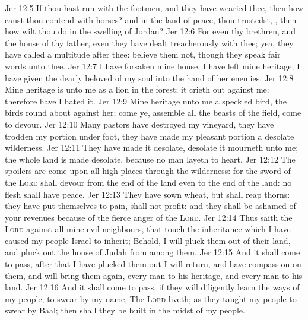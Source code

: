 \vs Jer 12:5 If thou hast run with the footmen, and they have wearied thee, then how canst thou contend with horses? and  in the land of peace,  thou trustedst, , then how wilt thou do in the swelling of Jordan?
\vs Jer 12:6 For even thy brethren, and the house of thy father, even they have dealt treacherously with thee; yea, they have called a multitude after thee: believe them not, though they speak fair words unto thee.
\vs Jer 12:7 I have forsaken mine house, I have left mine heritage; I have given the dearly beloved of my soul into the hand of her enemies.
\vs Jer 12:8 Mine heritage is unto me as a lion in the forest; it crieth out against me: therefore have I hated it.
\vs Jer 12:9 Mine heritage  unto me  a speckled bird, the birds round about  against her; come ye, assemble all the beasts of the field, come to devour.
\vs Jer 12:10 Many pastors have destroyed my vineyard, they have trodden my portion under foot, they have made my pleasant portion a desolate wilderness.
\vs Jer 12:11 They have made it desolate,  desolate it mourneth unto me; the whole land is made desolate, because no man layeth  to heart.
\vs Jer 12:12 The spoilers are come upon all high places through the wilderness: for the sword of the \textsc{Lord} shall devour from the  end of the land even to the  end of the land: no flesh shall have peace.
\vs Jer 12:13 They have sown wheat, but shall reap thorns: they have put themselves to pain,  shall not profit: and they shall be ashamed of your revenues because of the fierce anger of the \textsc{Lord}.
\vs Jer 12:14 Thus saith the \textsc{Lord} against all mine evil neighbours, that touch the inheritance which I have caused my people Israel to inherit; Behold, I will pluck them out of their land, and pluck out the house of Judah from among them.
\vs Jer 12:15 And it shall come to pass, after that I have plucked them out I will return, and have compassion on them, and will bring them again, every man to his heritage, and every man to his land.
\vs Jer 12:16 And it shall come to pass, if they will diligently learn the ways of my people, to swear by my name, The \textsc{Lord} liveth; as they taught my people to swear by Baal; then shall they be built in the midst of my people.
